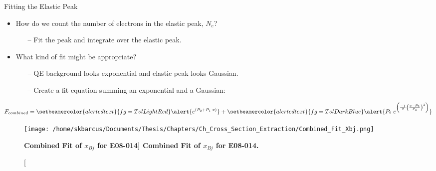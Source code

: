 \documentclass[10pt]{beamer}
\begin{document}
\begin{frame}[fragile]{Fitting the Elastic Peak}

	\begin{itemize}
		\item How do we count the number of electrons in the elastic peak, \alert{$N_e$}?
			\begin{itemize}
				\pause
				\item[--] \alert{Fit the peak and integrate} over the elastic peak.
			\end{itemize}
		\pause
		\item What kind of fit might be appropriate?
			\begin{itemize}
				\pause
				\item[--] QE \alert{background looks exponential} and elastic \alert{peak looks Gaussian}.
				\item[--] Create a fit equation summing an exponential and a Gaussian: 
			\end{itemize}
	\end{itemize}
	
	\pause
	\vspace{-4mm}
	\begin{equation} \label{eq:combined}
		F_{combined} = \setbeamercolor{alerted text}{fg=TolLightRed}\alert{e^{\left( P_0+P_1 \; x \right)}} + \setbeamercolor{alerted text}{fg=TolDarkBlue}\alert{P_2 \; e^{\left( \frac{-1}{2} \left( \frac{x-P_3}{P_4} \right)^2 \right)}}
	\end{equation}
	
	\pause
	\vspace{-5mm}
	\begin{figure}[!ht]
	\begin{center}
	\texttt{[image: /home/skbarcus/Documents/Thesis/Chapters/Ch\_Cross\_Section\_Extraction/Combined\_Fit\_Xbj.png]}
	\end{center}
	\caption[\bf{Combined Fit of $x_{Bj}$ for E08-014}]{
	{\bf{Combined Fit of $x_{Bj}$ for E08-014.}} }
	\label{fig:combined}
	\end{figure}

\end{frame}
\end{document}
